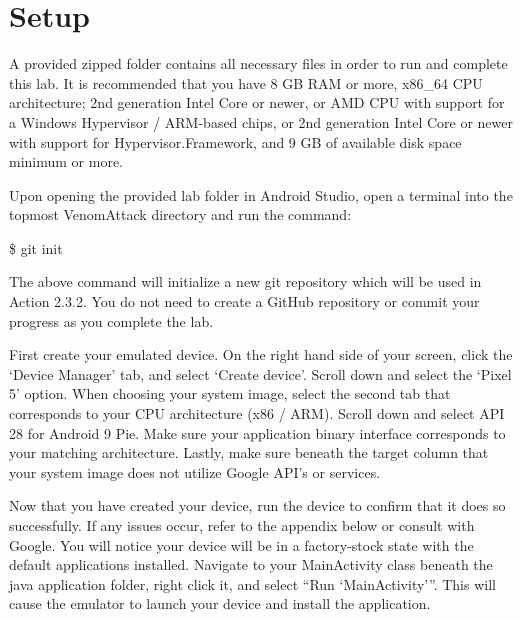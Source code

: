 \documentclass[letterpaper,12pt]{report}
\begin{document}

\section*{Setup}\label{sec:Setup}

A provided zipped folder contains all necessary files in order to run and complete this lab. It is recommended that you have 8 GB RAM or more, x86\_64 CPU architecture; 2nd generation Intel Core or newer, or AMD CPU with support for a Windows Hypervisor / ARM-based chips, or 2nd generation Intel Core or newer with support for Hypervisor.Framework, and 9 GB of available disk space minimum or more. 

\bigskip

Upon opening the provided lab folder in Android Studio, open a terminal into the topmost VenomAttack directory and run the command:

\bigskip
\begin{mdframed}[backgroundcolor=black!12,style=code,nobreak=true,align=center,userdefinedwidth=14cm]
    \$ git init
\end{mdframed}

The above command will initialize a new git repository which will be used in Action 2.3.2. You do not need to create a GitHub repository or commit your progress as you complete the lab.

First create your emulated device. On the right hand side of your screen, click the ‘Device Manager’ tab, and select ‘Create device’. Scroll down and select the ‘Pixel 5’ option. When choosing your system image, select the second tab that corresponds to your CPU architecture (x86 / ARM). Scroll down and select API 28 for Android 9 Pie. Make sure your application binary interface corresponds to your matching architecture. Lastly, make sure beneath the target column that your system image does not utilize Google API’s or services.

\bigskip

Now that you have created your device, run the device to confirm that it does so successfully. If any issues occur, refer to the appendix below or consult with Google. You will notice your device will be in a factory-stock state with the default applications installed. Navigate to your MainActivity class beneath the java application folder, right click it, and select “Run ‘MainActivity’”. This will cause the emulator to launch your device and install the application.  
\end{document}
